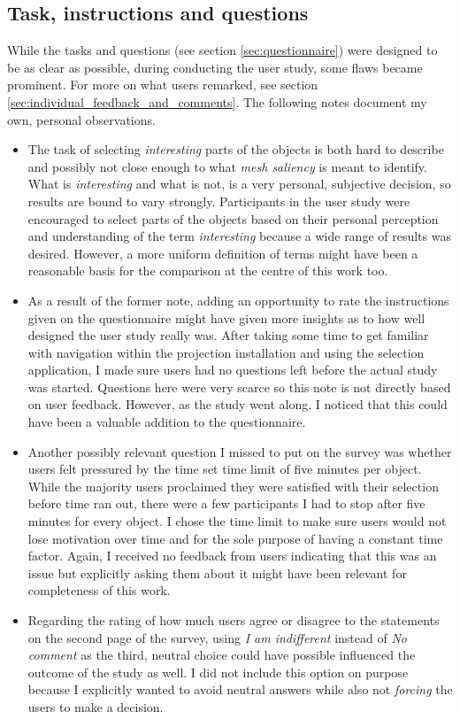 		\subsection{Task, instructions and questions}
		\label{sec:task_instructions_questions}
While the tasks and questions (see section \ref{sec:questionnaire}) were designed to be as clear as possible, during conducting the user study, some flaws became prominent. For more on what users remarked, see section \ref{sec:individual_feedback_and_comments}. The following notes document my own, personal observations.

\begin{itemize}
	\item The task of selecting \textit{interesting} parts of the objects is both hard to describe and possibly not close enough to what \textit{mesh saliency} is meant to identify. What is \textit{interesting} and what is not, is a very personal, subjective decision, so results are bound to vary strongly. Participants in the user study were encouraged to select parts of the objects based on their personal perception and understanding of the term \textit{interesting} because a wide range of results was desired. However, a more uniform definition of terms might have been a reasonable basis for the comparison at the centre of this work too.
	\item As a result of the former note, adding an opportunity to rate the instructions given on the questionnaire might have given more insights as to how well designed the user study really was. After taking some time to get familiar with navigation within the projection installation and using the selection application, I made sure users had no questions left before the actual study was started. Questions here were very scarce so this note is not directly based on user feedback. However, as the study went along, I noticed that this could have been a valuable addition to the questionnaire.
	\item Another possibly relevant question I missed to put on the survey was whether users felt pressured by the time set time limit of five minutes per object. While the majority users proclaimed they were satisfied with their selection before time ran out, there were a few participants I had to stop after five minutes for every object. I chose the time limit to make sure users would not lose motivation over time and for the sole purpose of having a constant time factor. Again, I received no feedback from users indicating that this was an issue but explicitly asking them about it might have been relevant for completeness of this work.
	\item Regarding the rating of how much users agree or disagree to the statements on the second page of the survey, using \textit{I am indifferent} instead of \textit{No comment} as the third, neutral choice could have possible influenced the outcome of the study as well. I did not include this option on purpose because I explicitly wanted to avoid neutral answers while also not \textit{forcing} the users to make a decision.
\end{itemize}

